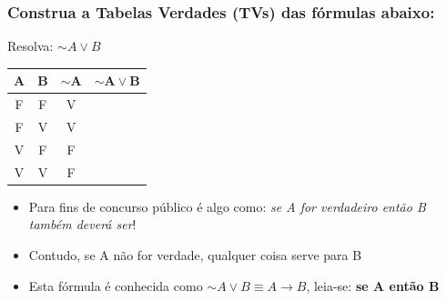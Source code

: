 \documentclass{beamer}
\begin{document}
\begin{frame}
\frametitle{Construa a Tabelas Verdades (TVs) das fórmulas abaixo:}


\begin{block}{Resolva: $\sim A \vee B$}
\begin{center}

	\begin{tabular}{|c|c|c|c|}
	\hline 	\hline
	$\mathbf{A}$ & $\mathbf{B}$ & $\mathbf{\sim A}$ & $\mathbf{\sim A \vee B}$ \\
	\hline
	F & F & V & \\
  \hline
	F & V & V & \\
	\hline
	V & F & F & \\
	\hline
	V & V & F & \\
	\hline 	\hline
	\end{tabular}
\end{center}
  
\begin{itemize}
   \item Para fins de concurso público é algo como: \textit{se A for verdadeiro então B também deverá ser}!
   \item Contudo, se A não for verdade, qualquer coisa serve para B
    \item  Esta fórmula é conhecida como $\sim A \vee B \equiv A \rightarrow B$, leia-se: \textbf{se A  então B}

  \end{itemize}
  \end{block}


\end{frame}
\end{document}
